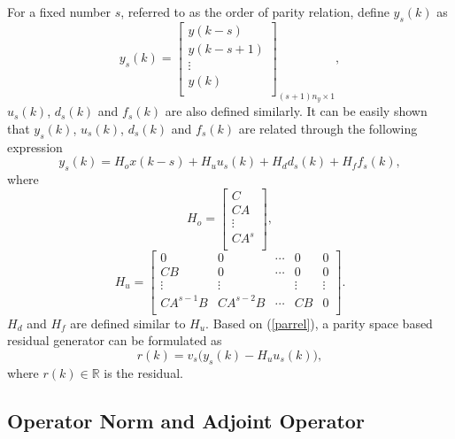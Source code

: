\documentclass[A4paper,conference]{IEEEtran}
\begin{document}
For a fixed number $s$, referred to as the order of parity relation,
define $y_s(k)$ as
\begin{equation*}
  y_s(k) = \left[
    \begin{array}{c}
    y(k-s) \\
    y(k-s+1) \\
    \vdots \\
    y(k) \\
    \end{array}
    \right]_{(s+1)n_y \times 1},
\end{equation*}
$u_s(k)$, $d_s(k)$ and $f_s(k)$ are also defined similarly. It can
be easily shown that $y_s(k)$, $u_s(k)$, $d_s(k)$ and $f_s(k)$ are
related through the following expression
\begin{equation}\label{parrel}
    y_s(k) = H_ox(k-s) + H_u u_s(k) + H_d d_s(k) + H_f f_s(k),
\end{equation}
where
\begin{equation*}
  H_{o} = \left[
    \begin{array}{c}
    C \\
    CA \\
    \vdots \\
    CA^s \\
    \end{array}
    \right],
\end{equation*}
\begin{equation*}
  H_{u} = \left[
    \begin{array}{ccccc}
      0 & 0 & \cdots & 0 & 0 \\
      CB & 0 & \cdots & 0 & 0 \\
      \vdots & \vdots &  & \vdots & \vdots \\
      CA^{s-1}B & CA^{s-2}B & \cdots & CB & 0 \\
    \end{array}
    \right].
\end{equation*}
$H_d$ and $H_f$ are defined similar to $H_u$. Based on
(\ref{parrel}), a parity space based residual generator can be
formulated as
\begin{equation*}%
    r(k)=v_s\big(y_s(k)-H_{u}u_s(k)\big),
\end{equation*}
where $r(k)\in \mathbb{R}$ is the residual. 

\subsection{Operator Norm and Adjoint Operator}
\newcommand{\norm}[1]{\left\lVert#1\right \lVert}
\newcommand{\innerp}[1]{\left \langle#1\right \rangle}
\end{document}
